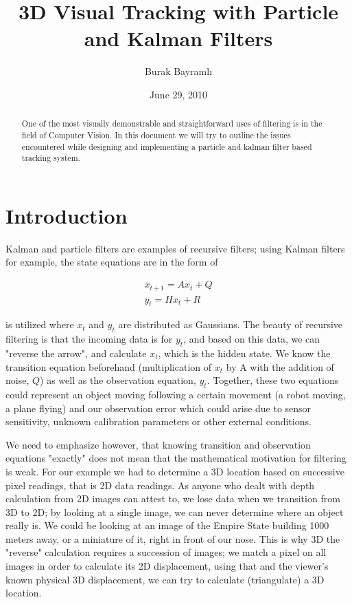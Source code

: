 \documentclass[11pt]{article}
\begin{document}
\title{3D Visual Tracking with Particle and Kalman Filters}
\author{Burak Bayramlı}
\date{June 29, 2010}

\maketitle

\begin{abstract}
One of the most visually demonstrable and straightforward uses of filtering is
in the field of Computer Vision. In this document we will try to outline the
issues encountered while designing and implementing a particle and kalman filter
based tracking system.
\end{abstract}

\section{Introduction}

Kalman and particle filters are examples of recursive filters; using Kalman
filters for example,  the state equations are in the form of 

\begin{eqnarray*}
x_{t+1} = A x_t + Q\\
y_t = Hx_t + R
\end{eqnarray*}

is utilized where $x_t$ and $y_t$ are distributed as Gaussians. The beauty of
recursive filtering is that the incoming data is for $y_t$, and based on this
data, we can "reverse the arrow", and calculate $x_t$, which is the hidden
state. We know the transition equation beforehand (multiplication of $x_t$ by A
with the addition of noise, $Q$) as well as the observation equation,
$y_t$. Together, these two equations could represent an object moving following
a certain movement (a robot moving, a plane flying) and our observation error
which could arise due to sensor sensitivity, unknown calibration parameters or
other external conditions.

We need to emphasize however, that knowing transition and observation equations
"exactly" does not mean that the mathematical motivation for filtering is
weak. For our example we had to determine a 3D location based on successive
pixel readings, that is 2D data readings. As anyone who dealt with depth
calculation from 2D images can attest to, we lose data when we transition from
3D to 2D; by looking at a single image, we can never determine where an object
really is. We could be looking at an image of the Empire State building 1000
meters away, or a miniature of it, right in front of our nose. This is why 3D
the "reverse" calculation requires a succession of images; we match a pixel on
all images in order to calculate its 2D displacement, using that and the
viewer's known physical 3D displacement, we can try to calculate (triangulate) a
3D location.
\end{document}
